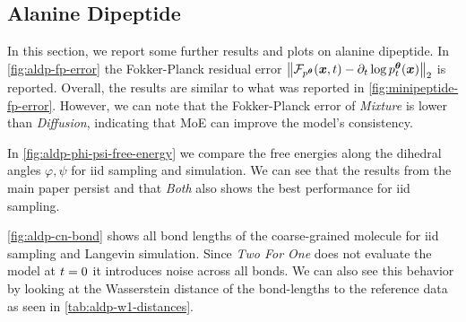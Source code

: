 \begin{table}[h]
    \centering
    \vspace{0.2cm}
    \caption{We report the training and inference time for the different models.}
    \label{tab:runtime}
\end{table}

\subsection{Alanine Dipeptide} \label{appx:aldp-bonds}
In this section, we report some further results and plots on alanine dipeptide. In \cref{fig:aldp-fp-error} the Fokker-Planck residual error $\left\Vert {\mathcal{F}}_{p^{\bm{\theta}}}({{\bm{x}}}, {t}) - \partial_{t} \log p^{\bm{\theta}}_{t}({{\bm{x}}})\right\Vert_2$ is reported. Overall, the results are similar to what was reported in \cref{fig:minipeptide-fp-error}. However, we can note that the Fokker-Planck error of \emph{Mixture} is lower than \emph{Diffusion}, indicating that \gls{MoE} can improve the model's consistency.

In \cref{fig:aldp-phi-psi-free-energy} we compare the free energies along the dihedral angles $\varphi, \psi$ for iid sampling and simulation. We can see that the results from the main paper persist and that \emph{Both} also shows the best performance for iid sampling. 

\cref{fig:aldp-cn-bond} shows all bond lengths of the coarse-grained molecule for iid sampling and Langevin simulation. Since \emph{Two For One} does not evaluate the model at ${t}=0$ it introduces noise across all bonds. We can also see this behavior by looking at the Wasserstein distance of the bond-lengths to the reference data as seen in \cref{tab:aldp-w1-distances}.

